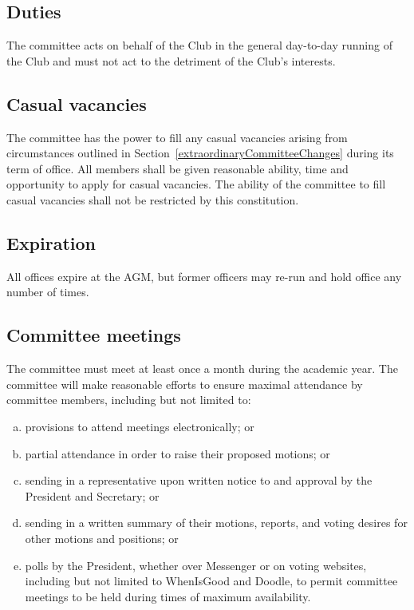 \documentclass{constitution}
\begin{document}
\subsection{Duties}
The committee acts on behalf of the Club in the general day-to-day running of the Club and must not act to the detriment of the Club's interests.

\subsection{Casual vacancies}\label{committeeCasualVacancies}
The committee has the power to fill any casual vacancies arising from circumstances outlined in Section~\ref{extraordinaryCommitteeChanges} during its term of office. All members shall be given reasonable ability, time and opportunity to apply for casual vacancies. The ability of the committee to fill casual vacancies shall not be restricted by this constitution.

\subsection{Expiration}
All offices expire at the AGM, but former officers may re-run and hold office any number of times.

\subsection{Committee meetings}
The committee must meet at least once a month during the academic year. The committee will make reasonable efforts to ensure maximal attendance by committee members, including but not limited to:
\begin{enumerate}[(a)]
    \item provisions to attend meetings electronically; or
    \item partial attendance in order to raise their proposed motions; or
    \item sending in a representative upon written notice to and approval by the President and Secretary; or
    \item sending in a written summary of their motions, reports, and voting desires for other motions and positions; or
    \item polls by the President, whether over Messenger or on voting websites, including but not limited to WhenIsGood and Doodle, to permit committee meetings to be held during times of maximum availability. %
\end{enumerate}
\end{document}
